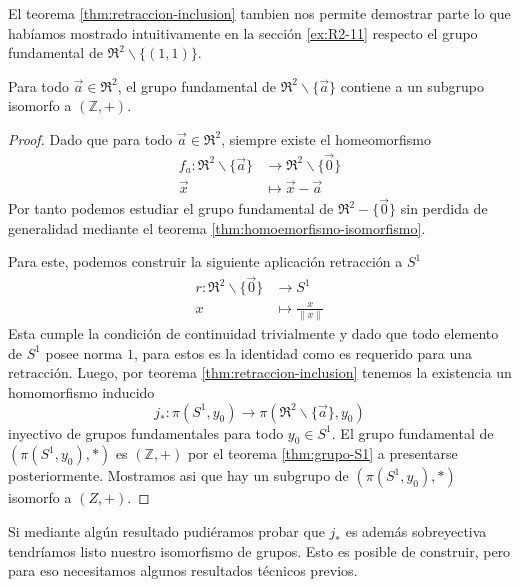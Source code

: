 El teorema \ref{thm:retraccion-inclusion} tambien nos permite demostrar
parte lo que habíamos mostrado intuitivamente en la sección
\ref{ex:R2-11} respecto el grupo fundamental de \(\Re ^2 \backslash
\{(1,1)\}\).
\begin{corolario} \label{cor:retraccion-R2-S1-inyectivo}
  Para todo \(\vec a \in \Re ^2\), el grupo fundamental de \(\Re ^2
\backslash \{\vec a\}\) contiene a un subgrupo isomorfo a \((\mathbb Z, +)\).
\end{corolario}
\begin{proof}
Dado que para todo \(\vec a \in \Re ^2 \), siempre existe
el homeomorfismo
\begin{align*}
   f_a : \Re^2 \backslash \{\vec a\} &\longrightarrow \Re ^2 \backslash
      \{\vec 0\} \\
   \vec x &\longmapsto \vec x - \vec a
\end{align*}
Por tanto podemos estudiar el grupo fundamental de \(\Re ^2 - \{\vec
0\}\) sin perdida de generalidad mediante el teorema
\ref{thm:homoemorfismo-isomorfismo}.

Para este, podemos construir la siguiente aplicación retracción a
\(S^1\)
\begin{align*}
   r : \Re ^2 \backslash \{\vec 0\} &\longrightarrow S^1 \\
   x &\longmapsto \frac x {\lVert x \rVert}
\end{align*}
Esta cumple la condición de continuidad trivialmente y dado que todo
elemento de \(S^1\) posee norma \(1\), para estos es la identidad
como es requerido para una retracción. Luego, por teorema
\ref{thm:retraccion-inclusion} tenemos la existencia un homomorfismo
inducido
\[ j_* : \pi (S^1 , y_0) \to \pi (\Re ^2 \backslash \{\vec a\}, y_0) \]
inyectivo de grupos fundamentales para todo \(y_0 \in S^1 \). El
grupo fundamental de \(\left( \pi (S^1, y_0) , * \right) \) es \( (\mathbb Z, +)\)
por el teorema \ref{thm:grupo-S1} a presentarse posteriormente.
Mostramos asi que hay un subgrupo de \(\left( \pi (S^1, y_0), * \right)
\) isomorfo a \((Z,+)\).
\end{proof}

Si mediante algún resultado pudiéramos probar que \(j_{*}\) es además
sobreyectiva tendríamos listo nuestro isomorfismo de grupos. Esto es
posible de construir, pero para eso necesitamos algunos resultados
técnicos previos.

